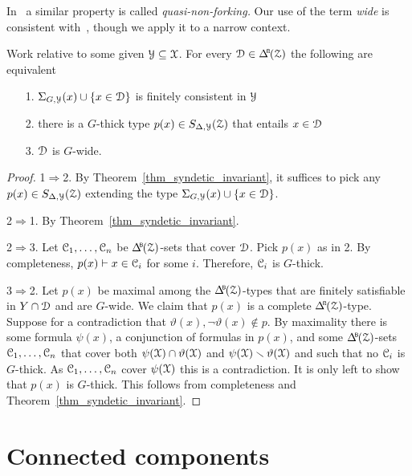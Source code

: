 In~\cite{CK} a similar property is called \textit{quasi-non-forking.}
Our use of the term \textit{wide\/} is consistent with~\cite{Hr}, though we apply it to a narrow context.

\begin{theorem}\label{thm_syndetic_invariant2}
  Work relative to some given $\EuScript Y\subseteq\EuScript X$.
  For every $\D\in\BDelta(\Z)$ the following are equivalent 
  \begin{itemize}
    \item[1.] $\Sigma_{G,\EuScript Y}(x)\cup\{x\in\EuScript D\}$ is finitely consistent in $\EuScript Y$
    \item[2.] there is a $G$-thick type $p(x)\in S_{\Delta,\EuScript Y}(\EuScript Z)$ that entails $x\in\EuScript D$
    \item[3.] $\EuScript D$ is $G$-wide.\smallskip
  \end{itemize}
\end{theorem}

\begin{proof}
  1$\Rightarrow$2.
  By Theorem~\ref{thm_syndetic_invariant}, it suffices to pick any $p(x)\in S_{\Delta,\EuScript Y}(\EuScript Z)$ extending the type $\Sigma_{G,\EuScript Y}(x)\cup\{x\in\EuScript D\}$.

  2$\Rightarrow$1.
  By Theorem~\ref{thm_syndetic_invariant}.

  2$\Rightarrow$3.
  Let $\EuScript C_1,\dots,\EuScript C_n$ be $\BDelta({\Z})$-sets that cover $\EuScript D$.
  Pick $p(x)$ as in 2.
  By completeness, $p(x)\vdash x\in\EuScript C_i$ for some $i$.
  Therefore, $\EuScript C_i$ is $G$-thick.

  3$\Rightarrow$2.
  Let $p(x)$ be maximal among the $\BDelta(\Z)$-types that are finitely satisfiable in $Y\cap\EuScript D$ and are $G$-wide.
  We claim that $p(x)$ is a complete $\BDelta(\Z)$-type.
  Suppose for a contradiction that $\vartheta(x),\neg\vartheta(x)\notin p$.
  By maximality there is some formula $\psi(x)$, a conjunction of formulas in $p(x)$, and some $\BDelta({\Z})$-sets $\EuScript C_1,\dots,\EuScript C_n$ that cover both $\psi(\EuScript X)\cap\vartheta(\EuScript X)$ and $\psi(\EuScript X)\smallsetminus\vartheta(\EuScript X)$ and such that no $\EuScript C_i$ is $G$-thick.
  As $\EuScript C_1,\dots,\EuScript C_n$ cover $\psi(\EuScript X)$ this is a contradiction.
  It is only left to show that $p(x)$ is $G$-thick.
  This follows from completeness and Theorem~\ref{thm_syndetic_invariant}.
\end{proof}


\section{Connected components}\label{G0}
\def\medrel#1{\parbox[t]{5ex}{$\displaystyle\hfil #1$}}
\def\ceq#1#2#3{\parbox[t]{12ex}{$\displaystyle #1$}\medrel{#2}{$\displaystyle #3$}}

